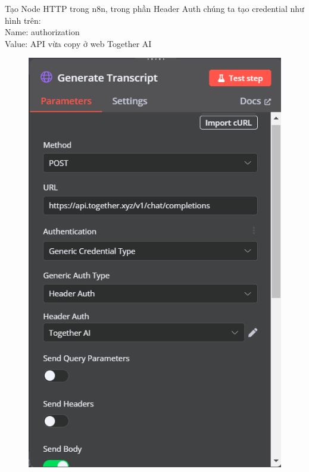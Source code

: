 \begin{itemize}[label=]
\begin{figure}[H]
    \end{figure}
    
 Tạo Node HTTP trong n8n, trong phần Header Auth chúng ta tạo credential như hình trên:\\
 Name: authorization\\
 Value: API vừa copy ở web Together AI\\
 
    \begin{figure}[H]
    \centering
    \begin{minipage}{0.45\textwidth}
        \includegraphics[width=\linewidth]{images/TogetherAI-2.png}
    \end{minipage}

\end{figure}
\end{itemize}
